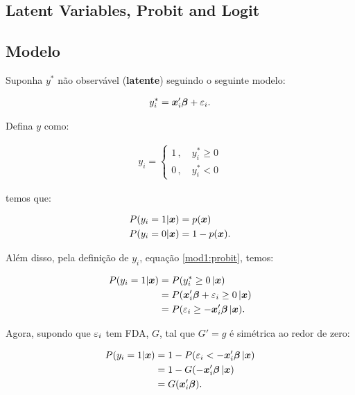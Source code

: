 \documentclass[11pt, oneside, a4paper, article]{article}
\numberwithin{equation}{section}
\begin{document}
\begin{description}
\clearpage
\section{Latent Variables, Probit and Logit}

\subsection{Modelo}

Suponha $y^{*}$ não observável (\textbf{latente}) seguindo o seguinte modelo:

\vspace{-1 em}
\begin{align} \label{mod1:probit}
y_{i}^{*} = \boldsymbol{x}_{i}' \boldsymbol{\beta} + \varepsilon_{i}.
\end{align}

\noindent
Defina $y$ como:

\vspace{-1 em}
\begin{align*}
y_{i} =
\begin{cases}
1 \, , \quad y^{*}_{i} \geq 0
\\
0 \, , \quad y^{*}_{i} < 0
\end{cases}
\end{align*}

\noindent
temos que:

\vspace{-1 em}
\begin{align*}
P( y_{i} = 1 | \boldsymbol{x} ) &= p( \boldsymbol{x} )
\\
P( y_{i} = 0 | \boldsymbol{x} ) &= 1 - p( \boldsymbol{x} ).
\end{align*}

Além disso, pela definição de $y_{i}$, equação \eqref{mod1:probit}, temos:

\vspace{-1 em}
\begin{align*}
P( y_{i} = 1 | \boldsymbol{x} ) &= P(y_{i}^{*} \geq 0 \, | \boldsymbol{x} )
\\
&= P( \boldsymbol{x}_{i}' \boldsymbol{\beta} + \varepsilon_{i} \geq 0 \, | \boldsymbol{x} )
\\
&= P( \varepsilon_{i} \geq - \boldsymbol{x}_{i}' \boldsymbol{\beta}  \, | \boldsymbol{x} ).
\end{align*}

\noindent
Agora, supondo que $\varepsilon_{i}$ tem FDA, $G$, tal que $G'=g$ é simétrica ao redor de zero:

\vspace{-1 em}
\begin{align*}
P( y_{i} = 1 | \boldsymbol{x} ) 
&= 1 - P( \varepsilon_{i} < - \boldsymbol{x}_{i}' \boldsymbol{\beta}  \, | \boldsymbol{x} )
\\
&= 1 - G( - \boldsymbol{x}_{i}' \boldsymbol{\beta}  \, | \boldsymbol{x} )
\\
&= G( \boldsymbol{x}_{i}' \boldsymbol{\beta} ).
\end{align*}


\end{description}
\end{document}
